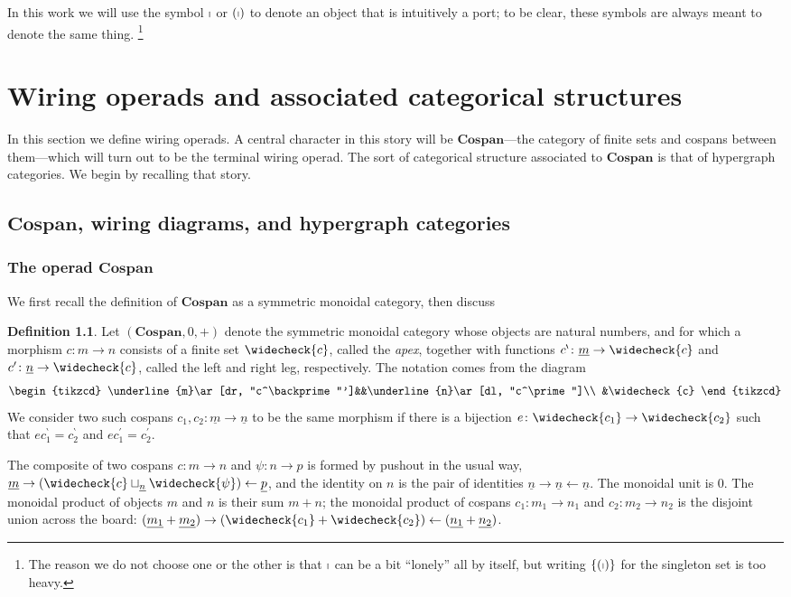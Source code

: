 \documentclass[11pt, article, oneside]{memoir}
\theoremstyle{plain}
\theoremstyle{definition}
\newtheorem{definition}[theorem]{Definition}
\theoremstyle{remark}
\newcommand{\Cat}[1]{\mathbf{#1}}
\newcommand{\from}{\leftarrow}
\newcommand{\ul}[1]{\underline{#1}}
\newcommand{\Cospan}{\Cat{Cospan}}
\newcommand{\lleg}[1]{#1^\backprime}
\newcommand{\rleg}[1]{#1^\prime}
\newcommand{\apex}[1]{\widecheck{#1}}
\newcommand{\cmap}{c}
\newcommand\stick{\shortmid}
\begin{document}
In this work we will use the symbol $\stick$ or $(\stick)$ to denote an object that is intuitively a port; to be clear, these symbols are always meant to denote the same thing.%
\footnote{The reason we do not choose one or the other is that $\stick$ can be a bit ``lonely'' all by itself, but writing $\{(\stick)\}$ for the singleton set is too heavy.}

\chapter{Wiring operads and associated categorical structures}

In this section we define wiring operads. A central character in this story will be $\Cospan$---the category of finite sets and cospans between them---which will turn out to be the terminal wiring operad. The sort of categorical structure associated to $\Cospan$ is that of hypergraph categories. We begin by recalling that story.

\section{$\Cospan$, wiring diagrams, and hypergraph categories}

\subsection{The operad $\Cospan$}

We first recall the definition of $\Cospan$ as a symmetric monoidal category, then discuss

\begin{definition}
Let $(\Cospan,0,+)$ denote the symmetric monoidal category whose objects are natural numbers, and for which a morphism $\cmap\colon m\to n$ consists of a finite set $\apex{\cmap}$, called the \emph{apex}, together with functions $\lleg\cmap\colon\ul{m}\to\apex{\cmap}$ and $\rleg\cmap\colon\ul{n}\to\apex{\cmap}$, called the left and right leg, respectively. The notation comes from the diagram
\[
\begin{tikzcd}
	\ul{m}\ar[dr, "\lleg\cmap"']&&\ul{n}\ar[dl, "\rleg\cmap"]\\
	&\apex{\cmap}
\end{tikzcd}
\]
We consider two such cospans $\cmap_1,\cmap_2\colon \ul{m}\to \ul{n}$ to be the same morphism if there is a bijection $e\colon\apex{\cmap_1}\to\apex{\cmap_2}$ such that $e\lleg\cmap_1=\lleg\cmap_2$ and $e\rleg\cmap_1=\rleg\cmap_2$.

The composite of two cospans $\cmap\colon m\to n$ and $\psi\colon n\to p$ is formed by pushout in the usual way, $\ul{m}\to(\apex{\cmap}\sqcup_{\ul{n}}\apex{\psi})\from\ul{p}$, and the identity on $n$ is the pair of identities $\ul{n}\to \ul{n}\from \ul{n}$. The monoidal unit is $0$. The monoidal product of objects $m$ and $n$ is their sum $m+n$; the monoidal product of cospans $\cmap_1\colon m_1\to n_1$ and $\cmap_2\colon m_2\to n_2$ is the disjoint union across the board: $(\ul{m_1}+\ul{m_2})\to(\apex{\cmap_1}+\apex{\cmap_2})\from (\ul{n_1}+\ul{n_2})$.
\end{definition}
\end{document}
